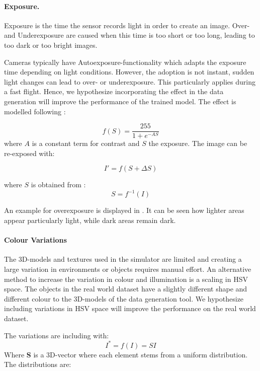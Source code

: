 \paragraph{Exposure.}

Exposure is the time the sensor records light in order to create an image. Over- and Underexposure are caused when this time is too short or too long, leading to too dark or too bright images.

Cameras typically have Autoexposure-functionality which adapts the exposure time depending on light conditions. However, the adoption is not instant, sudden light changes can lead to over- or underexposure. This particularly applies during a fast flight. Hence, we hypothesize incorporating the effect in the data generation will improve the performance of the trained model. The effect is modelled following \cite{Carlson2018}:

\begin{equation}
f(S) = \frac{255}{1 + e^{-A S}}
\end{equation}
where $A$ is a constant term for contrast and $S$ the exposure.
The image can be re-exposed with:

\begin{equation}
I' = f(S+\Delta S)
\end{equation}

where $S$ is obtained from :
\begin{equation}
S = f^{-1}(I)
\end{equation}

An example for overexposure is displayed in . It can be seen how lighter areas appear particularly light, while dark areas remain dark.

\paragraph{Colour Variations}

The 3D-models and textures used in the simulator are limited and creating a large variation in environments or objects requires manual effort. An alternative method to increase the variation in colour and illumination is a scaling in HSV space. The objects in the real world dataset have a slightly different shape and different colour to the 3D-models of the data generation tool. We hypothesize including variations in HSV space will improve the performance on the real world dataset.

The variations are including with:
\begin{equation}
	I^* = f(I) = S I
\end{equation}
Where \textbf{S} is a 3D-vector where each element stems from a uniform distribution. The distributions are:


